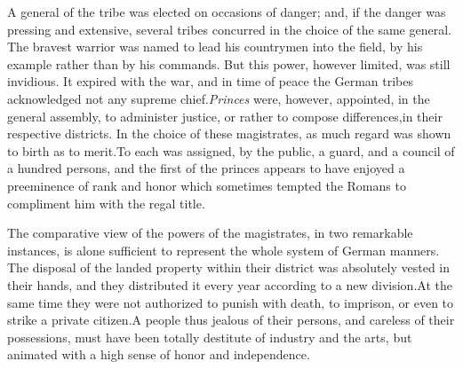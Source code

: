 

A general of the tribe was elected on occasions of danger; and,
if the danger was pressing and extensive, several tribes
concurred in the choice of the same general. The bravest warrior
was named to lead his countrymen into the field, by his example
rather than by his commands. But this power, however limited, was
still invidious. It expired with the war, and in time of peace
the German tribes acknowledged not any supreme chief.\footnotemark[47]
\textit{Princes} were, however, appointed, in the general assembly, to
administer justice, or rather to compose differences,\footnotemark[48] in their
respective districts. In the choice of these magistrates, as much
regard was shown to birth as to merit.\footnotemark[49] To each was assigned,
by the public, a guard, and a council of a hundred persons, and
the first of the princes appears to have enjoyed a preeminence of
rank and honor which sometimes tempted the Romans to compliment
him with the regal title.\footnotemark[50]





The comparative view of the powers of the magistrates, in two
remarkable instances, is alone sufficient to represent the whole
system of German manners. The disposal of the landed property
within their district was absolutely vested in their hands, and
they distributed it every year according to a new division.\footnotemark[51] At
the same time they were not authorized to punish with death, to
imprison, or even to strike a private citizen.\footnotemark[52] A people thus
jealous of their persons, and careless of their possessions, must
have been totally destitute of industry and the arts, but
animated with a high sense of honor and independence.



